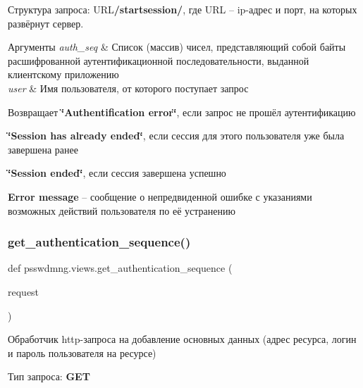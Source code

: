 Структура запроса\+: {\ttfamily U\+RL{\bfseries /startsession/}}, где {\ttfamily U\+RL} – ip-\/адрес и порт, на которых развёрнут сервер. 
\begin{DoxyParams}{Аргументы}
{\em auth\+\_\+seq} & Список (массив) чисел, представляющий собой байты расшифрованной аутентификационной последовательности, выданной клиентскому приложению \\
\hline
{\em user} & Имя пользователя, от которого поступает запрос \\
\hline
\end{DoxyParams}
\begin{DoxyReturn}{Возвращает}
{\bfseries \char`\"{}\+Authentification error\char`\"{}}, если запрос не прошёл аутентификацию 

{\bfseries \char`\"{}\+Session has already ended\char`\"{}}, если сессия для этого пользователя уже была завершена ранее 

{\bfseries \char`\"{}\+Session ended\char`\"{}}, если сессия завершена успешно 

{\bfseries Error message} – сообщение о непредвиденной ошибке с указаниями возможных действий пользователя по её устранению 
\end{DoxyReturn}
\mbox{\label{namespacepsswdmng_1_1views_a38563d05f60414abbf1e16b4b3a2e4a7}} 
\subsubsection{get\+\_\+authentication\+\_\+sequence()}
{\footnotesize\ttfamily def psswdmng.\+views.\+get\+\_\+authentication\+\_\+sequence (\begin{DoxyParamCaption}\item[{}]{request }\end{DoxyParamCaption})}



Обработчик http-\/запроса на добавление основных данных (адрес ресурса, логин и пароль пользователя на ресурсе) 

Тип запроса\+: {\bfseries G\+ET} 


